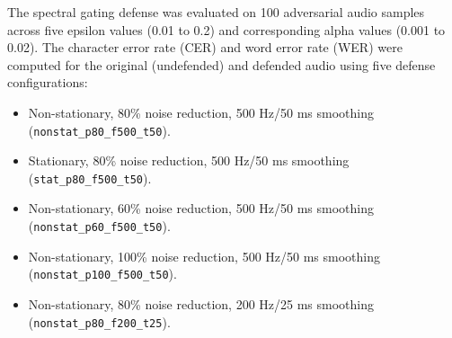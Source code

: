 \documentclass[a4paper,12pt]{article}
\begin{document}
The spectral gating defense was evaluated on 100 adversarial audio samples across five epsilon values (0.01 to 0.2) and corresponding alpha values (0.001 to 0.02). The character error rate (CER) and word error rate (WER) were computed for the original (undefended) and defended audio using five defense configurations:
\begin{itemize}
    \item Non-stationary, 80\% noise reduction, 500 Hz/50 ms smoothing (\texttt{nonstat\_p80\_f500\_t50}).
    \item Stationary, 80\% noise reduction, 500 Hz/50 ms smoothing (\texttt{stat\_p80\_f500\_t50}).
    \item Non-stationary, 60\% noise reduction, 500 Hz/50 ms smoothing (\texttt{nonstat\_p60\_f500\_t50}).
    \item Non-stationary, 100\% noise reduction, 500 Hz/50 ms smoothing (\texttt{nonstat\_p100\_f500\_t50}).
    \item Non-stationary, 80\% noise reduction, 200 Hz/25 ms smoothing (\texttt{nonstat\_p80\_f200\_t25}).
\end{itemize}
\end{document}
